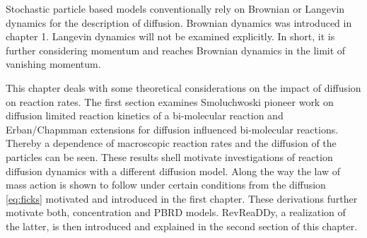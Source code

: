 \documentclass[
  a4paper,BCOR10mm,oneside,
  headsepline,footsepline,%
  fleqn,openbib
]{scrbook}
\begin{document}
Stochastic particle based models conventionally rely on Brownian or Langevin dynamics for the description of diffusion. Brownian dynamics was introduced in chapter 1. Langevin dynamics will not be examined explicitly. In short, it is further considering momentum and reaches Brownian dynamics in the limit of vanishing momentum.\par
This chapter deals with some theoretical considerations on the impact of diffusion on reaction rates. The first section examines Smoluchwoski pioneer work \cite{Smoluchowski1} on diffusion limited reaction kinetics of a bi-molecular reaction and Erban/Chapmman extensions \cite{Erban2009} for diffusion influenced bi-molecular reactions. Thereby a dependence of macroscopic reaction rates and the diffusion of the particles can be seen. These results shell motivate investigations of reaction diffusion dynamics with a different diffusion model. Along the way the law of mass action is shown to follow under certain conditions from the diffusion \cref{eq:ficks} motivated and introduced in the first chapter. These derivations further motivate both, concentration and PBRD models. RevReaDDy, a realization of the latter, is then introduced and explained in the second section of this chapter.
\end{document}
